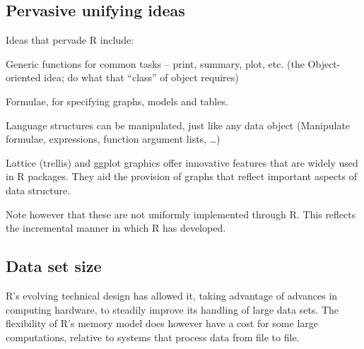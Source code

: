 \documentclass{tufte-book}\usepackage[]{graphicx}\usepackage[]{color}
\begin{document}
\subsection*{Pervasive unifying ideas}
Ideas that pervade R include:\\[-8pt]
\begin{list}{}{\setlength{\itemsep}{1pt} \setlength{\parsep}{1pt}}
\item[] Generic functions for common tasks -- print, summary, plot, etc.
(the Object-oriented idea; do what that ``class'' of object requires)

\item[] Formulae, for specifying graphs, models and tables.

\item[] Language structures can be manipulated, just like any
data object (Manipulate formulae, expressions, function argument
lists, \dots)

\item[] Lattice (trellis) and ggplot graphics offer innovative
  features that are widely used in R packages.  They aid the provision
  of graphs that reflect important aspects of data structure.

\end{list}
Note however that these are not uniformly implemented through R.
This reflects the incremental manner in which R has developed.

\subsection*{Data set size}
R's evolving technical design has allowed it, taking advantage of advances in computing hardware,
to steadily improve its handling of large data sets. The flexibility
of R's memory model does however have a cost for some large computations, relative to systems
that process data from file to file.
\end{document}
